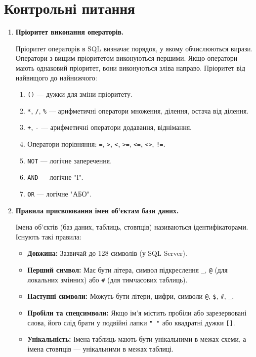 \documentclass{article}
\begin{document}
    \section*{Контрольні питання}
    \begin{enumerate}[label=\arabic*., leftmargin=*]
        \item \textbf{Пріоритет виконання операторів.}

        Пріоритет операторів в SQL визначає порядок, у якому обчислюються
        вирази. Оператори з вищим пріоритетом виконуються першими. Якщо
        оператори мають однаковий пріоритет, вони виконуються зліва направо.
        Пріоритет від найвищого до найнижчого:
        \begin{enumerate}
            \item \texttt{()} — дужки для зміни пріоритету.
            \item \texttt{*}, \texttt{/}, \texttt{\%} — арифметичні оператори множення, ділення, остача від ділення.
            \item \texttt{+}, \texttt{-} — арифметичні оператори додавання, віднімання.
            \item Оператори порівняння: \texttt{=}, \texttt{>}, \texttt{<}, \texttt{>=}, \texttt{<=}, \texttt{<>}, \texttt{!=}.
            \item \texttt{NOT} — логічне заперечення.
            \item \texttt{AND} — логічне "І".
            \item \texttt{OR} — логічне "АБО".
        \end{enumerate}

        \item \textbf{Правила присвоювання імен об’єктам бази даних.}

        Імена об'єктів (баз даних, таблиць, стовпців) називаються
        ідентифікаторами. Існують такі правила:
        \begin{itemize}
            \item \textbf{Довжина:} Зазвичай до 128 символів (у SQL Server).
            \item \textbf{Перший символ:} Має бути літера, символ підкреслення \texttt{\_}, \texttt{@} (для локальних змінних) або \texttt{\#} (для тимчасових таблиць).
            \item \textbf{Наступні символи:} Можуть бути літери, цифри, символи \texttt{@}, \texttt{\$}, \texttt{\#}, \texttt{\_}.
            \item \textbf{Пробіли та спецсимволи:} Якщо ім'я містить пробіли або зарезервовані слова, його слід брати у подвійні лапки \texttt{" "} або квадратні дужки \texttt{[]}.
            \item \textbf{Унікальність:} Імена таблиць мають бути унікальними в межах схеми, а імена стовпців — унікальними в межах таблиці.
        \end{itemize}
        

\end{enumerate}
\end{document}

